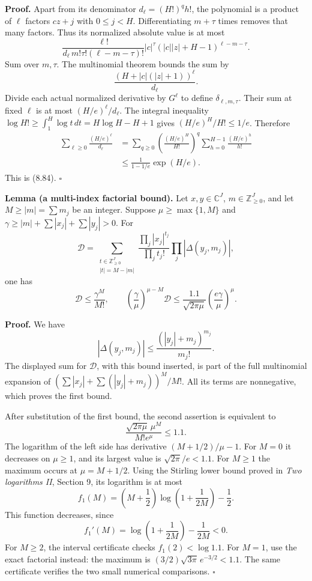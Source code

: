 \documentclass[
  11pt,
  a4paper,
]{article}
\begin{document}
\textbf{Proof.} Apart from its denominator \(d_\ell=(H!)^q h!\), the
polynomial is a product of \(\ell\) factors \(cz+j\) with \(0\le j<H\).
Differentiating \(m+\tau\) times removes that many factors. Thus its
normalized absolute value is at most \[
\frac{\ell!}{d_\ell\,m!\tau!(\ell-m-\tau)!}
|c|^\tau(|c||z|+H-1)^{\ell-m-\tau}.
\] Sum over \(m,\tau\). The multinomial theorem bounds the sum by \[
\frac{(H+|c|(|z|+1))^\ell}{d_\ell}.
\] Divide each actual normalized derivative by \(G^\ell\) to define
\(\delta_{\ell,m,\tau}\). Their sum at fixed \(\ell\) is at most
\((H/e)^\ell/d_\ell\). The integral inequality
\(\log H!\ge\int_1^H\log t\,dt=H\log H-H+1\) gives \((H/e)^H/H!\le1/e\).
Therefore \[
\begin{aligned}
\sum_{\ell\ge0}\frac{(H/e)^\ell}{d_\ell}
&=\sum_{q\ge0}
\left(\frac{(H/e)^H}{H!}\right)^q
\sum_{h=0}^{H-1}\frac{(H/e)^h}{h!}\\
&\le\frac1{1-1/e}\exp(H/e).
\end{aligned}
\] This is (8.84). \(\square\)

\textbf{Lemma (a multi-index factorial bound).} Let
\(x,y\in\mathbb C^J\), \(m\in\mathbb Z_{\ge0}^J\), and let
\(M\ge|m|=\sum m_j\) be an integer. Suppose \(\mu\ge\max\{1,M\}\) and
\(\gamma\ge|m|+\sum|x_j|+\sum|y_j|>0\). For \[
\mathcal D=
\sum_{\substack{t\in\mathbb Z_{\ge0}^J\\|t|=M-|m|}}
\frac{\prod_j|x_j|^{t_j}}{\prod_jt_j!}
\prod_j|\Delta(y_j,m_j)|,
\] one has \[
\mathcal D\le\frac{\gamma^M}{M!},\qquad
\left(\frac\gamma\mu\right)^{\mu-M}\mathcal D
\le\frac{1.1}{\sqrt{2\pi\mu}}
\left(\frac{e\gamma}{\mu}\right)^\mu. \tag{8.85}
\]

\textbf{Proof.} We have \[
|\Delta(y_j,m_j)|\le\frac{(|y_j|+m_j)^{m_j}}{m_j!}.
\] The displayed sum for \(\mathcal D\), with this bound inserted, is
part of the full multinomial expansion of
\((\sum |x_j|+\sum(|y_j|+m_j))^M/M!\). All its terms are nonnegative,
which proves the first bound.

After substitution of the first bound, the second assertion is
equivalent to \[
\frac{\sqrt{2\pi\mu}\,\mu^M}{M!e^\mu}\le1.1.
\] The logarithm of the left side has derivative \((M+1/2)/\mu-1\). For
\(M=0\) it decreases on \(\mu\ge1\), and its largest value is
\(\sqrt{2\pi}/e<1.1\). For \(M\ge1\) the maximum occurs at
\(\mu=M+1/2\). Using the Stirling lower bound proved in \emph{Two
logarithms II}, Section 9, its logarithm is at most \[
f_1(M)=\left(M+\frac12\right)
\log\left(1+\frac1{2M}\right)-\frac12.
\] This function decreases, since \[
f_1'(M)=\log\left(1+\frac1{2M}\right)-\frac1{2M}<0.
\] For \(M\ge2\), the interval certificate checks \(f_1(2)<\log1.1\).
For \(M=1\), use the exact factorial instead: the maximum is
\((3/2)\sqrt{3\pi}\,e^{-3/2}<1.1\). The same certificate verifies the
two small numerical comparisons. \(\square\)
\end{document}

